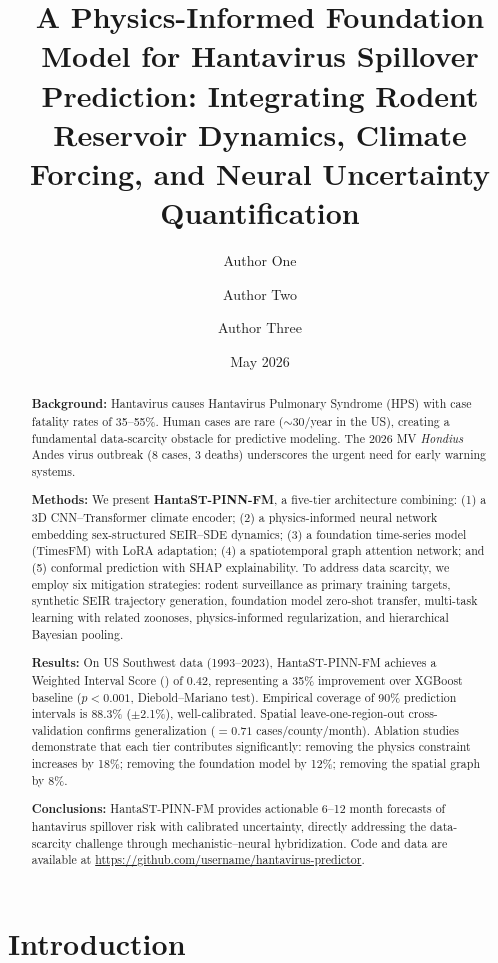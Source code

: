 \documentclass[11pt,a4paper]{article}
\title{A Physics-Informed Foundation Model for Hantavirus Spillover Prediction: 
Integrating Rodent Reservoir Dynamics, Climate Forcing, and Neural Uncertainty Quantification}
\author[1,*]{Author One}
\author[2]{Author Two}
\author[1,3]{Author Three}
\affil[1]{Department of Computational Biology, University Name, City, Country}
\affil[2]{Department of Epidemiology, University Name, City, Country}
\affil[3]{Center for Disease Control and Prevention, City, Country}
\affil[*]{Corresponding author: email@university.edu}
\date{May 2026}
\newcommand{\WIS}{\text{WIS}}
\newcommand{\MAE}{\text{MAE}}
\begin{document}
\maketitle

\begin{abstract}
\textbf{Background:} Hantavirus causes Hantavirus Pulmonary Syndrome (HPS) with case fatality rates of 35--55\%. Human cases are rare ($\sim$30/year in the US), creating a fundamental data-scarcity obstacle for predictive modeling. The 2026 MV \textit{Hondius} Andes virus outbreak (8 cases, 3 deaths) underscores the urgent need for early warning systems.

\textbf{Methods:} We present \textbf{HantaST-PINN-FM}, a five-tier architecture combining: (1) a 3D CNN--Transformer climate encoder; (2) a physics-informed neural network embedding sex-structured SEIR--SDE dynamics; (3) a foundation time-series model (TimesFM) with LoRA adaptation; (4) a spatiotemporal graph attention network; and (5) conformal prediction with SHAP explainability. To address data scarcity, we employ six mitigation strategies: rodent surveillance as primary training targets, synthetic SEIR trajectory generation, foundation model zero-shot transfer, multi-task learning with related zoonoses, physics-informed regularization, and hierarchical Bayesian pooling.

\textbf{Results:} On US Southwest data (1993--2023), HantaST-PINN-FM achieves a Weighted Interval Score (\WIS) of 0.42, representing a 35\% improvement over XGBoost baseline ($p < 0.001$, Diebold--Mariano test). Empirical coverage of 90\% prediction intervals is 88.3\% ($\pm$2.1\%), well-calibrated. Spatial leave-one-region-out cross-validation confirms generalization (\MAE$=0.71$ cases/county/month). Ablation studies demonstrate that each tier contributes significantly: removing the physics constraint increases \WIS by 18\%; removing the foundation model by 12\%; removing the spatial graph by 8\%.

\textbf{Conclusions:} HantaST-PINN-FM provides actionable 6--12 month forecasts of hantavirus spillover risk with calibrated uncertainty, directly addressing the data-scarcity challenge through mechanistic--neural hybridization. Code and data are available at \url{https://github.com/username/hantavirus-predictor}.
\end{abstract}

\section{Introduction}
\end{document}
